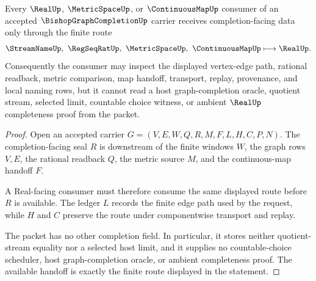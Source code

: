 \begin{theorem}
\label{thm:bishop-graph-completion-real-handoff}
Every $\RealUp$, $\MetricSpaceUp$, or $\ContinuousMapUp$ consumer of an accepted $\BishopGraphCompletionUp$ carrier receives completion-facing data only through the finite route
$$
\StreamNameUp,\ \RegSeqRatUp,\ \MetricSpaceUp,\ \ContinuousMapUp \longmapsto \RealUp .
$$
Consequently the consumer may inspect the displayed vertex-edge path, rational readback, metric comparison, map handoff, transport, replay, provenance, and local naming rows, but it cannot read a host graph-completion oracle, quotient stream, selected limit, countable choice witness, or ambient $\RealUp$ completeness proof from the packet.
\end{theorem}
\begin{proof}
Open an accepted carrier $G=(V,E,W,Q,R,M,F,L,H,C,P,N)$. The completion-facing seal $R$ is downstream of the finite windows $W$, the graph rows $V,E$, the rational readback $Q$, the metric source $M$, and the continuous-map handoff $F$.

A Real-facing consumer must therefore consume the same displayed route before $R$ is available. The ledger $L$ records the finite edge path used by the request, while $H$ and $C$ preserve the route under componentwise transport and replay.

The packet has no other completion field. In particular, it stores neither quotient-stream equality nor a selected host limit, and it supplies no countable-choice scheduler, host graph-completion oracle, or ambient completeness proof. The available handoff is exactly the finite route displayed in the statement.
\end{proof}



